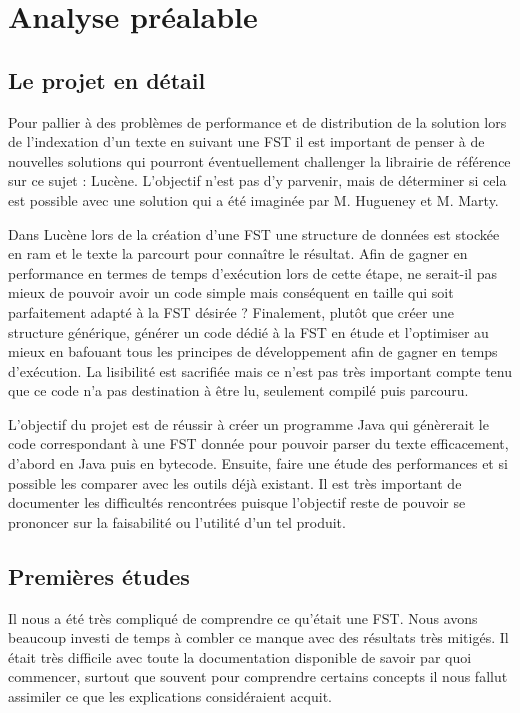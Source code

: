 \newpage
\section{Analyse préalable}

\subsection{Le projet en détail}

Pour pallier à des problèmes de performance et de distribution de la solution lors de
l'indexation d'un texte en suivant une FST il est important de penser à de nouvelles
solutions qui pourront éventuellement challenger la librairie de référence sur ce sujet :
Lucène. L'objectif n'est pas d'y parvenir, mais de déterminer si cela est possible avec
une solution qui a été imaginée par M. Hugueney et M. Marty.


Dans Lucène lors de la création d'une FST une structure de données est stockée en ram et
le texte la parcourt pour connaître le résultat. Afin de gagner en performance en termes
de temps d'exécution lors de cette étape, ne serait-il pas mieux de pouvoir avoir un code
simple mais conséquent en taille qui soit parfaitement adapté à la FST désirée ? Finalement,
plutôt que créer une structure générique, générer un code dédié à la FST en étude et l'optimiser
au mieux en bafouant tous les principes de développement afin de gagner en temps d'exécution.
La lisibilité est sacrifiée mais ce n'est pas très important compte tenu que ce code n'a pas
destination à être lu, seulement compilé puis parcouru.\newline


L'objectif du projet est de réussir à créer un programme Java qui génèrerait le code correspondant
à une FST donnée pour pouvoir parser du texte efficacement, d'abord en Java puis en bytecode.
Ensuite, faire une étude des performances et si possible les comparer avec les outils déjà existant.
Il est très important de documenter les difficultés rencontrées puisque l'objectif reste de
pouvoir se prononcer sur la faisabilité ou l'utilité d'un tel produit.

\subsection{Premières études}

Il nous a été très compliqué de comprendre ce qu'était une FST. Nous avons beaucoup investi de
temps à combler ce manque avec des résultats très mitigés. Il était très difficile avec toute la
documentation disponible de savoir par quoi commencer, surtout que souvent pour comprendre
certains concepts il nous fallut assimiler ce que les explications considéraient acquit.

